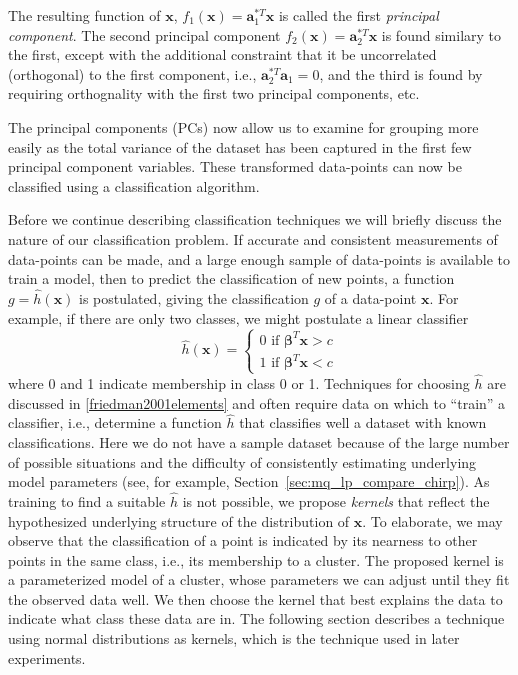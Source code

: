 The resulting function of $\boldsymbol{x}$,
$f_1(\boldsymbol{x})=\boldsymbol{a}_{1}^{\ast T}\boldsymbol{x}$ is called the first
\textit{principal component}. The second principal component
$f_2(\boldsymbol{x})=\boldsymbol{a}_{2}^{\ast T}\boldsymbol{x}$ is found similary
to the first, except with the additional constraint that it be uncorrelated
(orthogonal) to the first component, i.e.,
$\boldsymbol{a}_{2}^{\ast T}\boldsymbol{a}_{1}=0$, and the third is found by
requiring orthognality with the first two principal components, etc.

The principal components (PCs) now allow us to examine for grouping more easily as the
total variance of the dataset has been captured in the first few principal component
variables. These transformed data-points can now be classified using a
classification algorithm.

Before we continue describing classification techniques we will briefly discuss
the nature of our classification problem. If accurate and consistent
measurements of data-points can be made, and a large enough sample of
data-points is available to train a model, then to predict the classification of
new points, a function $g=\hat{h} \left( \boldsymbol{x} \right)$ is postulated,
giving the classification $g$ of a data-point $\boldsymbol{x}$. For example, if
there are only two classes, we might postulate a linear
classifier
\[
    \hat{h}(\boldsymbol{x}) = \begin{cases}
        0 \text{ if } \boldsymbol{\beta}^{T}\boldsymbol{x} > c \\
        1 \text{ if } \boldsymbol{\beta}^{T}\boldsymbol{x} < c
    \end{cases}
\]
where 0 and 1 indicate membership in class 0 or 1. Techniques for choosing
$\hat{h}$ are discussed in \ref{friedman2001elements} and often require data on
which to ``train'' a classifier, i.e., determine a function $\hat{h}$ that
classifies well a dataset with known classifications.  Here we do not have a
sample dataset because of the large number of possible situations and the
difficulty of consistently estimating underlying model parameters (see, for
example, Section~\ref{sec:mq_lp_compare_chirp}). As training to find a suitable
$\hat{h}$ is not possible, we propose \textit{kernels} that reflect the
hypothesized underlying structure of the distribution of $\boldsymbol{x}$. To
elaborate, we may observe that the classification of a
point is indicated by its nearness to other points in the same class, i.e., its
membership to a cluster. The proposed kernel is a parameterized model of a
cluster, whose parameters we can adjust until they fit the observed data well.
We then choose the kernel that best explains the data to indicate what class
these data are in. The following section describes a technique using normal
distributions as kernels, which is the technique used in later experiments.

